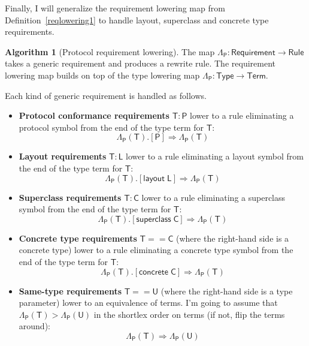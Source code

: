 \documentclass[a4paper,headsepline,bibliography=totoc,toc=flat,fleqn,twoside=semi]{scrbook}
\theoremstyle{definition}
\theoremstyle{definition}
\theoremstyle{definition}
\newtheorem{algorithm}{Algorithm}[chapter]
\newcommand{\namesym}[1]{\mathsf{#1}}
\newcommand{\proto}[1]{\bm{\mathsf{#1}}}
\newcommand{\protosym}[1]{[\proto{#1}]}
\newcommand{\layoutsym}[1]{[\mathsf{layout\;#1}]}
\newcommand{\supersym}[1]{[\mathsf{superclass}\;#1]}
\newcommand{\concretesym}[1]{[\mathsf{concrete}\;#1]}
\begin{document}
Finally, I will generalize the requirement lowering map from Definition~\ref{reqlowering1} to handle layout, superclass and concrete type requirements.

\begin{algorithm}[Protocol requirement lowering]\label{lowerreqinproto}
The map $\Lambda_{\proto{P}}\colon\namesym{Requirement}\rightarrow\namesym{Rule}$ takes a generic requirement and produces a rewrite rule. The requirement lowering map builds on top of the type lowering map $\Lambda_{\proto{P}}\colon \namesym{Type} \rightarrow \namesym {Term}$.

Each kind of generic requirement is handled as follows.
\begin{itemize}
\item \textbf{Protocol conformance requirements} $\namesym{T}\colon\proto{P}$ lower to a rule eliminating a protocol symbol from the end of the type term for $\namesym{T}$:
\[\Lambda_{\proto{P}}(\namesym{T}).\protosym{P} \Rightarrow \Lambda_{\proto{P}}(\namesym{T})\]
\item \textbf{Layout requirements} $\namesym{T}\colon\namesym{L}$ lower to a rule eliminating a layout symbol from the end of the type term for $\namesym{T}$:
\[\Lambda_{\proto{P}}(\namesym{T}).\layoutsym{L} \Rightarrow \Lambda_{\proto{P}}(\namesym{T})\]
\item \textbf{Superclass requirements} $\namesym{T}\colon\namesym{C}$ lower to a rule eliminating a superclass symbol from the end of the type term for $\namesym{T}$:
\[\Lambda_{\proto{P}}(\namesym{T}).\supersym{\namesym{C}} \Rightarrow \Lambda_{\proto{P}}(\namesym{T})\]
\item \textbf{Concrete type requirements} $\namesym{T}==\namesym{C}$ (where the right-hand side is a concrete type) lower to a rule eliminating a concrete type symbol from the end of the type term for $\namesym{T}$:
\[\Lambda_{\proto{P}}(\namesym{T}).\concretesym{\namesym{C}}\Rightarrow\Lambda_{\proto{P}}(\namesym{T})\]
\item \textbf{Same-type requirements} $\namesym{T}==\namesym{U}$ (where the right-hand side is a type parameter) lower to an equivalence of terms. I'm going to assume that $\Lambda_{\proto{P}}(\namesym{T}) > \Lambda_{\proto{P}}(\namesym{U})$ in the shortlex order on terms (if not, flip the terms around):
\[\Lambda_{\proto{P}}(\namesym{T}) \Rightarrow \Lambda_{\proto{P}}(\namesym{U})\]
\end{itemize}


\end{algorithm}
\end{document}
